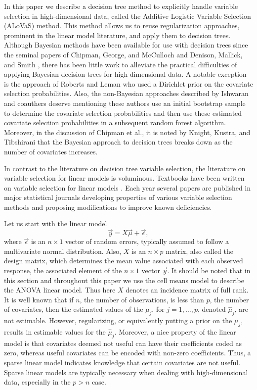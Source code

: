 In this paper we describe a decision tree method to explicitly handle variable selection in high-dimensional data, called the Additive Logistic Variable Selection  (ALoVaS) method. This method allows us to reuse regularization approaches, prominent in the linear model literature, and apply them to decision trees. Although Bayesian methods have been available for use with decision trees since the seminal papers of Chipman, George, and McCulloch \cite{chipman1998bayesian}  and Denison, Mallick, and Smith \cite{denison1998bayesian}, there has been little work to alleviate the practical difficulties of applying Bayesian decision trees for high-dimensional data. A notable exception is the approach of Roberts and Leman \cite{Roberts:2013uq} who used a Dirichlet prior on the covariate selection probabilities. Also, the non-Bayesian approaches described by Ishwaran and coauthers \cite{ishwaran2011random,ishwaran2010high,ishwaran2007variable} deserve mentioning these authors use an initial bootstrap sample to determine the covariate selection probabilities and then use these estimated covariate selection probabilities in a subsequent random forest algorithm. Moreover, in the discussion of Chipman et al., it is noted by Knight, Kustra, and Tibshirani \cite{knight1998bayesian} that the Bayesian approach to decision trees breaks down as the number of covariates increases. 

In contrast to the literature on decision tree variable selection, the literature on variable selection for linear models is voluminous. Textbooks have been written on variable selection for linear models \cite{miller2002subset}. Each year several papers are published in major statistical journals developing properties of various variable selection methods and proposing modifications to improve known deficiencies. 

Let us start with the linear model
\begin{equation}\label{def:linear_model}
\vec{y} = X\vec{\mu} + \vec{\epsilon},
\end{equation}
where $\vec{\epsilon}$ is an $n \times 1$ vector of random errors, typically assumed to follow a multivariate normal distribution. Also, $X$ is an $n \times p$ matrix, also called the design matrix, which determines the mean value associated with each observed response, the associated element of the $n\times 1$ vector $\vec{y}$. It should be noted that in this section and throughout this paper we use the cell means model to describe the ANOVA linear model. Thus here $X$ denotes an incidence matrix of full rank. It is well known that if $n$, the number of observations, is less than $p$, the number of covariates, then the estimated values of the $\mu_j$, for $j=1,\dots,p$, denoted $\hat{\mu}_j$, are not estimable. However, regularizing, or equivalently putting a prior on the $\mu_j$, results in estimable values for the $\hat{\mu}_j$. Moreover, a nice property of the linear model is that covariates deemed not useful can have their coefficients coded as zero, whereas useful covariates can be encoded with non-zero coefficients. Thus, a sparse linear model indicates knowledge that certain covariates are not useful. Sparse linear models are typically necessary when dealing with high-dimensional data, especially in the $p>n$ case. 

